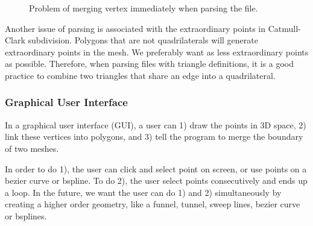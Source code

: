 \documentclass[12pt]{article}
\begin{document}
\begin{figure}[ht]
  \centering
  \caption{Problem of merging vertex immediately when parsing the file.}
  \label{figure:parserMerge}
\end{figure}

Another issue of parsing is associated with the extraordinary points in Catmull-Clark subdivision. Polygons that are not quadrilaterals will generate extraordinary points in the mesh. We preferably want as less extraordinary points as possible. Therefore, when parsing files with triangle definitions, it is a good practice to combine two triangles that share an edge into a quadrilateral.

\subsubsection{Graphical User Interface}
In a graphical user interface (GUI), a user can 1) draw the points in 3D space, 2) link these vertices into polygons, and 3) tell the program to merge the boundary of two meshes. 

In order to do 1), the user can click and select point on screen, or use points on a bezier curve or bspline. To do 2), the user select points consecutively and ends up a loop. In the future, we want the user can do 1) and 2) simultaneously by creating a higher order geometry, like a funnel, tunnel, sweep lines, bezier curve or bsplines.
\end{document}
